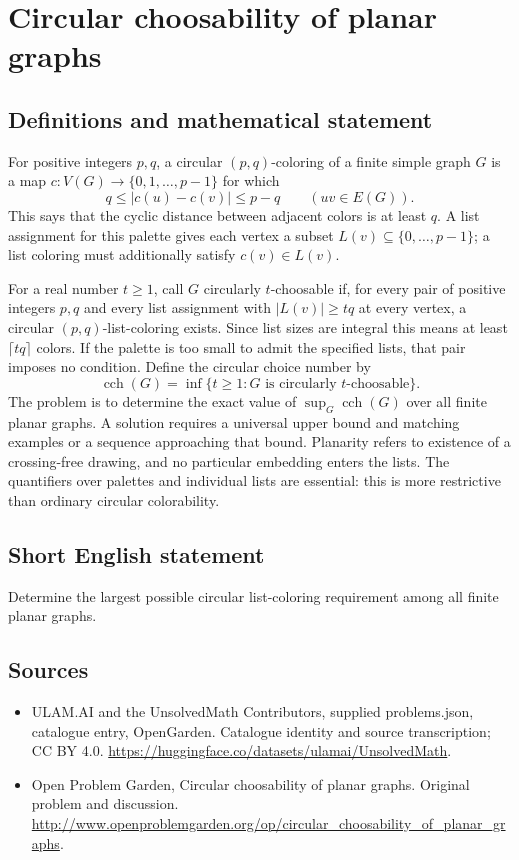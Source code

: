 \documentclass[11pt,a4paper]{article}
\begin{document}
\section*{Circular choosability of planar graphs}\label{statement}

\subsection{Definitions and mathematical statement}
For positive integers $p,q$, a circular $(p,q)$-coloring of a finite simple graph $G$ is a map $c:V(G)\to\{0,1,\ldots,p-1\}$ for which
\[
 q\le |c(u)-c(v)|\le p-q\qquad(uv\in E(G)).
\]
This says that the cyclic distance between adjacent colors is at least $q$. A list assignment for this palette gives each vertex a subset $L(v)\subseteq\{0,\ldots,p-1\}$; a list coloring must additionally satisfy $c(v)\in L(v)$.

For a real number $t\ge1$, call $G$ circularly $t$-choosable if, for every pair of positive integers $p,q$ and every list assignment with $|L(v)|\ge tq$ at every vertex, a circular $(p,q)$-list-coloring exists. Since list sizes are integral this means at least $\lceil tq\rceil$ colors. If the palette is too small to admit the specified lists, that pair imposes no condition. Define the circular choice number by
\[
 \operatorname{cch}(G)=\inf\{t\ge1:G\text{ is circularly }t\text{-choosable}\}.
\]
The problem is to determine the exact value of $\sup_G\operatorname{cch}(G)$ over all finite planar graphs. A solution requires a universal upper bound and matching examples or a sequence approaching that bound. Planarity refers to existence of a crossing-free drawing, and no particular embedding enters the lists. The quantifiers over palettes and individual lists are essential: this is more restrictive than ordinary circular colorability.
\subsection{Short English statement}
Determine the largest possible circular list-coloring requirement among all finite planar graphs.
\subsection{Sources}
\begin{itemize}
\item[S1] ULAM.AI and the UnsolvedMath Contributors, supplied problems.json, catalogue entry, OpenGarden. Catalogue identity and source transcription; CC BY 4.0.
\url{https://huggingface.co/datasets/ulamai/UnsolvedMath}.
\item[S2] Open Problem Garden, Circular choosability of planar graphs. Original problem and discussion.
\url{http://www.openproblemgarden.org/op/circular_choosability_of_planar_graphs}.
\end{itemize}
\end{document}
